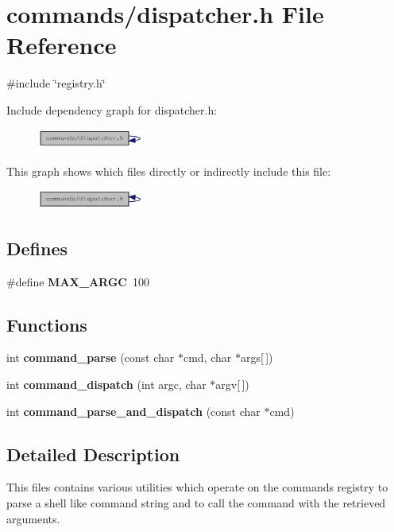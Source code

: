 \section{commands/dispatcher.h File Reference}
\label{da/d73/dispatcher_8h}
{\ttfamily \#include \char`\"{}registry.h\char`\"{}}\par
Include dependency graph for dispatcher.h:\nopagebreak
\begin{figure}[H]
\begin{center}
\leavevmode
\includegraphics[width=99pt]{d4/d88/dispatcher_8h__incl}
\end{center}
\end{figure}
This graph shows which files directly or indirectly include this file:\nopagebreak
\begin{figure}[H]
\begin{center}
\leavevmode
\includegraphics[width=99pt]{db/dda/dispatcher_8h__dep__incl}
\end{center}
\end{figure}
\subsection*{Defines}
\begin{DoxyCompactItemize}
\item 
\#define {\bf MAX\_\-ARGC}~100
\end{DoxyCompactItemize}
\subsection*{Functions}
\begin{DoxyCompactItemize}
\item 
int {\bf command\_\-parse} (const char $\ast$cmd, char $\ast$args[$\,$])
\item 
int {\bf command\_\-dispatch} (int argc, char $\ast$argv[$\,$])
\item 
int {\bf command\_\-parse\_\-and\_\-dispatch} (const char $\ast$cmd)
\end{DoxyCompactItemize}


\subsection{Detailed Description}
This files contains various utilities which operate on the commands registry to parse a shell like command string and to call the command with the retrieved arguments. 

